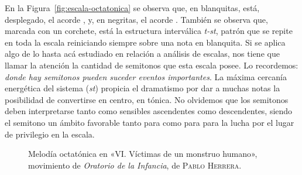 \documentclass[a4paper,11pt]{article}
\begin{document}
\begin{multicols}{2}
En la Figura~\ref{fig:escala-octatonica} se observa que, en blanquitas, está, desplegado, el acorde , y, en negritas, el acorde \hbox{.} También se observa que, marcada con un corchete, está la estructura interválica \emph{t-st}, patrón que se repite en toda la escala reiniciando siempre sobre una nota en blanquita. Si se aplica algo de lo hasta acá estudiado en relación a análisis de escalas, nos tiene que llamar la atención la cantidad de semitonos que esta escala posee. Lo recordemos: \emph{donde hay semitonos pueden suceder eventos importantes}. La máxima cercanía energética del sistema (\emph{st}) propicia el dramatismo por dar a muchas notas la posibilidad de convertirse en centro, en tónica. No olvidemos que los semitonos deben interpretarse tanto como sensibles ascendentes como descendentes, siendo el semitono  un ámbito favorable tanto para  como para  para la lucha por el lugar de privilegio en la escala.
\end{multicols}

\begin{figure}[ht]
\centering
\caption{Melodía octatónica en «VI. Víctimas de un monstruo humano», movimiento de \emph{Oratorio de la Infancia}, de \textsc{Pablo Herrera}.}\label{fig:melodia-octatonica}
\end{figure}
\end{document}
